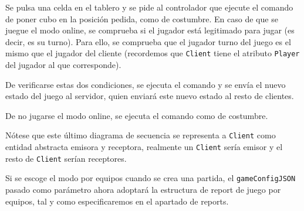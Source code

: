 \documentclass[../DocumentoOficial.tex]{subfiles}
\begin{document}
Se pulsa una celda en el tablero y se pide al controlador que ejecute el comando de poner cubo en la posición pedida, como de costumbre. En caso de que se juegue el modo online, se comprueba si el jugador está legitimado para jugar (es decir, es su turno). Para ello, se comprueba que el jugador turno del juego es el mismo que el jugador del cliente (recordemos que \texttt{Client} tiene el atributo \texttt{Player} del jugador al que corresponde).

De verificarse estas dos condiciones, se ejecuta el comando y se envía el nuevo estado del juego al servidor, quien enviará este nuevo estado al resto de clientes.

De no jugarse el modo online, se ejecuta el comando como de costumbre.

Nótese que este último diagrama de secuencia se representa a \texttt{Client} como entidad abstracta emisora y receptora, realmente un \texttt{Client} sería emisor y el resto de \texttt{Client} serían receptores.

Si se escoge el modo por equipos cuando se crea una partida, el \texttt{gameConfigJSON} pasado como parámetro ahora adoptará la estructura de report de juego por equipos, tal y como especificaremos en el apartado de reports.

\newpage
\end{document}
